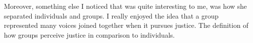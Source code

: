 \documentclass[11pt, oneside]{article}
\begin{document}
\par Moreover, something else I noticed that was quite interesting to me, was how she separated individuals and groups. I really enjoyed the idea that a group represented many voices joined together when it pursues justice. The definition of how groups perceive justice in comparison to individuals. 
\end{document}
